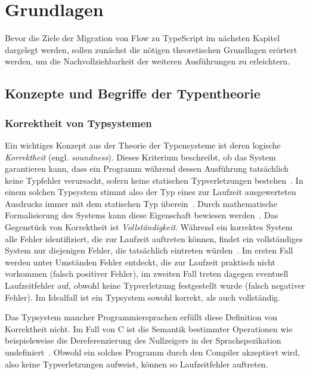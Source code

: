 \chapter{Grundlagen}
\label{chap:basics}

Bevor die Ziele der Migration von Flow zu TypeScript im nächsten Kapitel dargelegt werden, sollen zunächst die nötigen theoretischen Grundlagen erörtert werden, um die Nachvollziehbarkeit der weiteren Ausführungen zu erleichtern.

\section{Konzepte und Begriffe der Typentheorie}

\subsection{Korrektheit von Typsystemen}
Ein wichtiges Konzept aus der Theorie der Typensysteme ist deren logische \textit{Korrektheit} (engl. \textit{soundness}). Dieses Kriterium beschreibt, ob das System garantieren kann, dass ein Programm während dessen Ausführung tatsächlich keine Typfehler verursacht, sofern keine statischen Typverletzungen bestehen~\autocite{WRIGHT:1994}. In einem solchen Typsystem stimmt also der Typ eines zur Laufzeit ausgewerteten Ausdrucks immer mit dem statischen Typ überein~\autocite{DART:TYPE_SYSTEM}. Durch mathematische Formalisierung des Systems kann diese Eigenschaft bewiesen werden~\autocite[7]{CARDELLI:TYPE_SYSTEMS}. Das Gegenstück von Korrektheit ist \textit{Vollständigkeit}. Während ein korrektes System alle Fehler identifiziert, die zur Laufzeit auftreten können, findet ein vollständiges System nur diejenigen Fehler, die tatsächlich eintreten würden~\autocite{FLOW:TYPES_AND_EXPRESSIONS}. Im ersten Fall werden unter Umständen Fehler entdeckt, die zur Laufzeit praktisch nicht vorkommen (falsch positiver Fehler), im zweiten Fall treten dagegen eventuell Laufzeitfehler auf, obwohl keine Typverletzung festgestellt wurde (falsch negativer Fehler). Im Idealfall ist ein Typsystem sowohl korrekt, als auch vollständig.

Das Typsystem mancher Programmiersprachen erfüllt diese Definition von Korrektheit nicht. Im Fall von C ist die Semantik bestimmter Operationen wie beispielsweise die Dereferenzierung des Nullzeigers in der Sprachspezikation undefiniert~\autocite[79]{ISO:C99}. Obwohl ein solches Programm durch den Compiler akzeptiert wird, also keine Typverletzungen aufweist, können so Laufzeitfehler auftreten.

